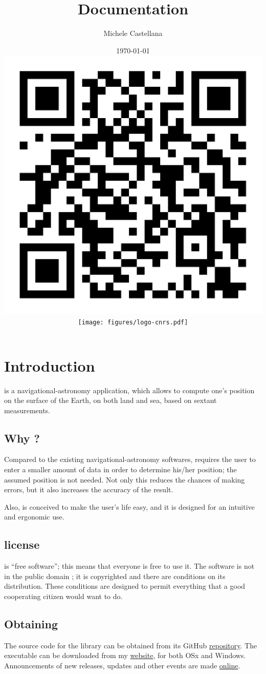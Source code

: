 \documentclass{ol-softwaremanual}
\title{Documentation}
\author{Michele Castellana}
\date{\today\\
\includegraphics[height=0.2\textwidth]{figures/qr-code-thelemacus.png}
\hspace{\stretch{2}} \texttt{[image: figures/logo-cnrs.pdf]}
}
\begin{document}
\setlength\intextsep{0pt}


\maketitle

\tableofcontents
\newpage

\section{Introduction}


\thel  is a navigational-astronomy application, which allows to compute one's \gls{position} on the surface of the Earth, on both land and sea, based on \gls{sextant} measurements. 


\subsection{Why \thel?}

Compared to the existing navigational-astronomy softwares, \thel requires the user to enter a smaller amount of data in order to determine his/her \gls{position}; the assumed \gls{position} is not needed. Not only this reduces the chances of making errors, but it also increases the accuracy of the result. 

Also, \thel is conceived to make the user's life easy, and it is designed for an intuitive and ergonomic   use.

\subsection{\thel license}\label{sec-license}

\thel is ``free software''; this means that everyone is free to use it. The software is not in the public domain \cite{castellana2024thelemacus}; it is copyrighted and there are conditions on its distribution. These conditions are designed to permit everything that a good cooperating citizen would want to do.

\subsection{Obtaining \thel}

The source code for the library can be obtained from its  GitHub \href{https://github.com/mcastel1/thelemacus}{repository}. The executable can be downloaded from my \href{\thelemacusurl}{website}, for both OSx and Windows.  Announcements of new releases, updates and other  events are made \href{\thelemacusurl}{online}. 
\end{document}
